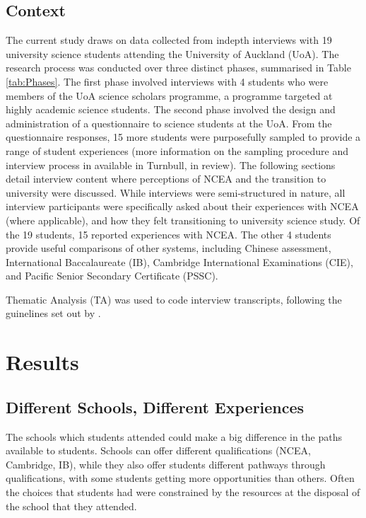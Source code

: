 \documentclass[a4paper,man,natbib]{apa6}
\begin{document}
\subsection{Context}
The current study draws on data collected from indepth interviews with 19 university science students attending the University of Auckland (UoA). The research process was conducted over three distinct phases, summarised in Table \ref{tab:Phases}. The first phase involved interviews with 4 students who were members of the UoA science scholars programme, a programme targeted at highly academic science students. The second phase involved the design and administration of a questionnaire to science students at the UoA. From the questionnaire responses, 15 more students were purposefully sampled to provide a range of student experiences (more information on the sampling procedure and interview process in available in Turnbull, in review). The following sections detail interview content where perceptions of NCEA and the transition to university were discussed. While interviews were semi-structured in nature, all interview participants were specifically asked about their experiences with NCEA (where applicable), and how they felt transitioning to university science study. Of the 19 students, 15 reported experiences with NCEA. The other 4 students provide useful comparisons of other systems, including Chinese assessment, International Baccalaureate (IB), Cambridge International Examinations (CIE), and Pacific Senior Secondary Certificate (PSSC).

Thematic Analysis (TA) was used to code interview transcripts, following the guinelines set out by \cite{Braun_2006}. 

\section{Results}

\subsection{Different Schools, Different Experiences}

The schools which students attended could make a big difference in the paths available to students. Schools can offer different qualifications (NCEA, Cambridge, IB), while they also offer students different pathways through qualifications, with some students getting more opportunities than others. Often the choices that students had were constrained by the resources at the disposal of the school that they attended. 
\end{document}

